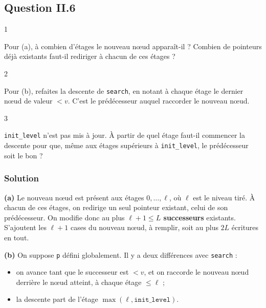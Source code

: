 \documentclass[11pt,a4paper]{article}
\providecommand{\tightlist}{\setlength{\itemsep}{0pt}\setlength{\parskip}{0pt}}
\begin{document}
\hypertarget{question-ii.6}{%
\subsection{Question II.6}\label{question-ii.6}}

\begin{indication}{1}

Pour (a), à combien d'étages le nouveau nœud apparaît-il ? Combien de pointeurs déjà existants faut-il rediriger à chacun de ces étages ?

\end{indication}

\begin{indication}{2}

Pour (b), refaites la descente de \texttt{search}, en notant à chaque étage le dernier nœud de valeur \(<v\). C'est le prédécesseur auquel raccorder le nouveau nœud.

\end{indication}

\begin{indication}{3}

\texttt{init\_level} n'est pas mis à jour. À partir de quel étage faut-il commencer la descente pour que, même aux étages supérieurs à \texttt{init\_level}, le prédécesseur soit le bon ?

\end{indication}

\hypertarget{solution-15}{%
\subsubsection{Solution}\label{solution-15}}

\textbf{(a)} Le nouveau nœud est présent aux étages \(0,\dots,\ell\), où \(\ell\) est le niveau tiré. À chacun de ces étages, on redirige un seul pointeur existant, celui de son prédécesseur. On modifie donc au plus \textbf{\(\ell+1\le L\) successeurs} existants. S'ajoutent les \(\ell+1\) cases du nouveau nœud, à remplir, soit au plus \(2L\) écritures en tout.

\textbf{(b)} On suppose \texttt{p} défini globalement. Il y a deux différences avec \texttt{search} :

\begin{itemize}
\tightlist
\item
  on avance tant que le successeur est \(<v\), et on raccorde le nouveau nœud derrière le nœud atteint, à chaque étage \(\le\ell\) ;
\item
  la descente part de l'étage \(\max(\ell,\texttt{init\_level})\).
\end{itemize}
\end{document}
